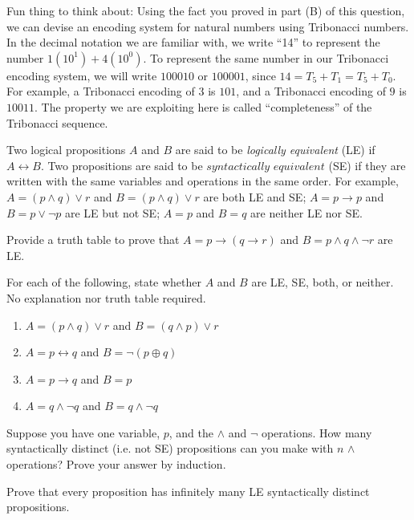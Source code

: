 \documentclass[solution, letterpaper]{cs20}
\begin{document}
Fun thing to think about: Using the fact you proved in part (B) of this question, we can devise an encoding system for natural numbers using Tribonacci numbers. In the decimal notation we are familiar with, we write ``14'' to represent the number $1(10^1) + 4(10^0)$. To represent the same number in our Tribonacci encoding system, we will write $100010$ or $100001$, since $14 = T_5 + T_1 = T_5 + T_0$. For example, a Tribonacci encoding of $3$ is $101$, and a Tribonacci encoding of $9$ is $10011$. The property we are exploiting here is called ``completeness'' of the Tribonacci sequence.


Two logical propositions $A$ and $B$ are said to be \textit{logically equivalent} (LE) if $A \leftrightarrow B$. Two propositions are said to be $\textit{syntactically equivalent}$ (SE) if they are written with the same variables and operations in the same order. For example, $A = (p \land q) \lor r$ and $B = (p \land q) \lor r$ are both LE and SE; $A  = p \to p$ and $B = p \lor \neg p$ are LE but not SE; $A = p$ and $B = q$ are neither LE nor SE.

\subproblem Provide a truth table to prove that $A  = p \to (q \to r)$ and $B = p \land q \land \neg r$ are LE.

\subproblem For each of the following, state whether $A$ and $B$ are LE, SE, both, or neither. No explanation nor truth table required.

\begin{enumerate}
\item $A = (p \land q) \lor r$ and $B = (q \land p) \lor r$
\item $A = p \leftrightarrow q$ and $B = \neg (p \oplus q)$
\item $A = p \to q$ and $B = p$
\item $A = q \land \neg q$ and $B = q \land \neg q$
\end{enumerate}

\subproblem Suppose you have one variable, $p$, and the $\land$ and $\neg$ operations. How many syntactically distinct (i.e. not SE) propositions can you make with $n$ $\land$ operations? Prove your answer by induction.

\subproblem Prove that every proposition has infinitely many LE syntactically distinct propositions.
\end{document}
